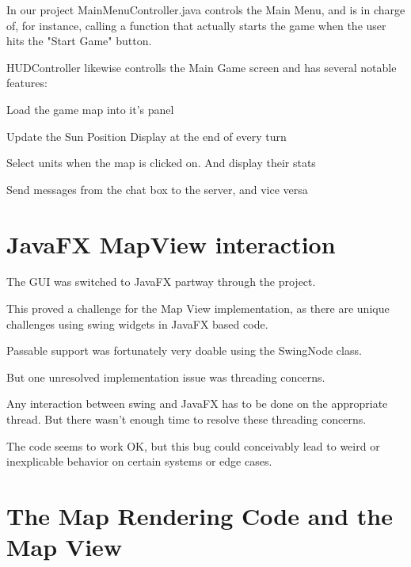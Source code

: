 \documentclass[12pt,a4paper]{article}
\begin{document}
In our project MainMenuController.java controls the Main Menu, and is in charge
of, for instance, calling a function that actually starts the game when the
user hits the "Start Game" button.

HUDController likewise controlls the Main Game screen and has several notable
features:

\begin{itemize}
\begin{item} Load the game map into it's panel \end{item}
\begin{item} Update the Sun Position Display at the end of every turn \end{item}
\begin{item} Select units when the map is clicked on. And display their stats
\end{item}
\begin{item} Send messages from the chat box to the server, and vice versa
\end{item}
\end{itemize}

\section{JavaFX MapView interaction}
The GUI was switched to JavaFX partway through the project.

This proved a challenge for the Map View implementation, as there are unique
challenges using swing widgets in JavaFX based code.

Passable support was fortunately very doable using the SwingNode class.

But one unresolved implementation issue was threading concerns.

Any interaction between swing and JavaFX has to be done on the appropriate
thread. But there wasn't enough time to resolve these threading concerns.

The code seems to work OK, but this bug could conceivably lead to weird
or inexplicable behavior on certain systems or edge cases.

\section{The Map Rendering Code and the Map View}
\end{document}
